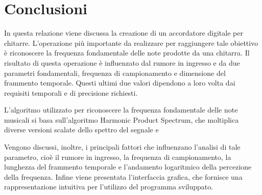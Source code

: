 \chapter{Conclusioni}\label{cap:conclusioni}

In questa relazione viene discussa la creazione di un accordatore digitale per chitarre.
L'operazione più importante da realizzare per raggiungere tale obiettivo è riconoscere la frequenza fondamentale delle note prodotte da una chitarra.
Il risultato di questa operazione è influenzato dal rumore in ingresso e da due parametri fondamentali, frequenza di campionamento e dimensione del frammento temporale.
Questi ultimi due valori dipendono a loro volta dai requisiti temporali e di precisione richiesti.

L'algoritmo utilizzato per riconoscere la frequenza fondamentale delle note musicali si basa sull'algoritmo Harmonic Product Spectrum, che moltiplica diverse versioni scalate dello spettro del segnale e 

Vengono discussi, inoltre, i principali fattori che influenzano l'analisi di tale parametro, cioè il rumore in ingresso, la frequenza di campionamento, la lunghezza del frammento temporale e l'andamento logaritmico della percezione della frequenza. 
Infine viene presentata l'interfaccia grafica, che fornisce una rappresentazione intuitiva per l'utilizzo del programma sviluppato.


